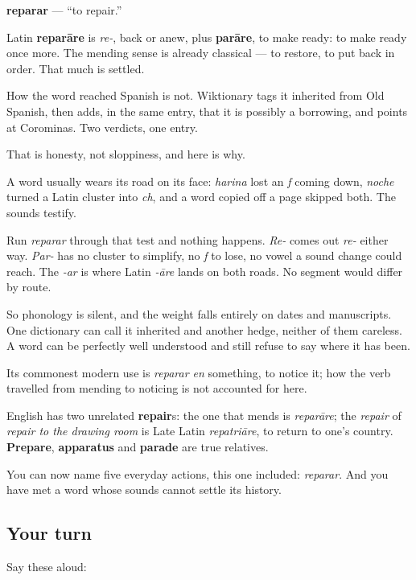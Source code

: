 \begin{cousinweb}
\textbf{reparar} — \textquotedblleft{}to repair.\textquotedblright{}

Latin \textbf{reparāre} is \emph{re-}, back or anew, plus \textbf{parāre}, to make ready: to make ready once more. The mending sense is already classical — to restore, to put back in order. That much is settled.

How the word reached Spanish is not. Wiktionary tags it inherited from Old Spanish, then adds, in the same entry, that it is possibly a borrowing, and points at Corominas. Two verdicts, one entry.

That is honesty, not sloppiness, and here is why.

A word usually wears its road on its face: \emph{harina} lost an \emph{f} coming down, \emph{noche} turned a Latin cluster into \emph{ch}, and a word copied off a page skipped both. The sounds testify.

Run \emph{reparar} through that test and nothing happens. \emph{Re-} comes out \emph{re-} either way. \emph{Par-} has no cluster to simplify, no \emph{f} to lose, no vowel a sound change could reach. The \emph{-ar} is where Latin \emph{-āre} lands on both roads. No segment would differ by route.

So phonology is silent, and the weight falls entirely on dates and manuscripts. One dictionary can call it inherited and another hedge, neither of them careless. A word can be perfectly well understood and still refuse to say where it has been.

Its commonest modern use is \emph{reparar en} something, to notice it; how the verb travelled from mending to noticing is not accounted for here.

English has two unrelated \textbf{repair}s: the one that mends is \emph{reparāre}; the \emph{repair} of \emph{repair to the drawing room} is Late Latin \emph{repatriāre}, to return to one's country. \textbf{Prepare}, \textbf{apparatus} and \textbf{parade} are true relatives.
\end{cousinweb}

\begin{grammarlens}[title={What you've built}]
You can now name five everyday actions, this one included: \emph{reparar}. And you have met a word whose sounds cannot settle its history.
\end{grammarlens}

\subsection*{Your turn}
Say these aloud:

